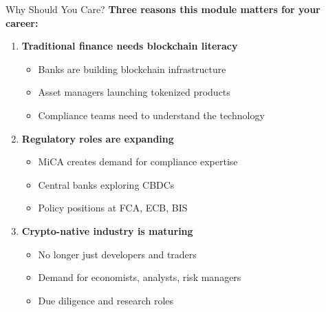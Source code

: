 \documentclass[10pt]{beamer}
\begin{document}
\begin{frame}{Why Should You Care?}
  \textbf{Three reasons this module matters for your career:}
  
  \vspace{1em}
  \begin{enumerate}
    \item \textbf{Traditional finance needs blockchain literacy}
    \begin{itemize}
      \item Banks are building blockchain infrastructure
      \item Asset managers launching tokenized products
      \item Compliance teams need to understand the technology
    \end{itemize}
    
    \vspace{0.5em}
    \item \textbf{Regulatory roles are expanding}
    \begin{itemize}
      \item MiCA creates demand for compliance expertise
      \item Central banks exploring CBDCs
      \item Policy positions at FCA, ECB, BIS
    \end{itemize}
    
    \vspace{0.5em}
    \item \textbf{Crypto-native industry is maturing}
    \begin{itemize}
      \item No longer just developers and traders
      \item Demand for economists, analysts, risk managers
      \item Due diligence and research roles
    \end{itemize}
  \end{enumerate}
\end{frame}
\end{document}
